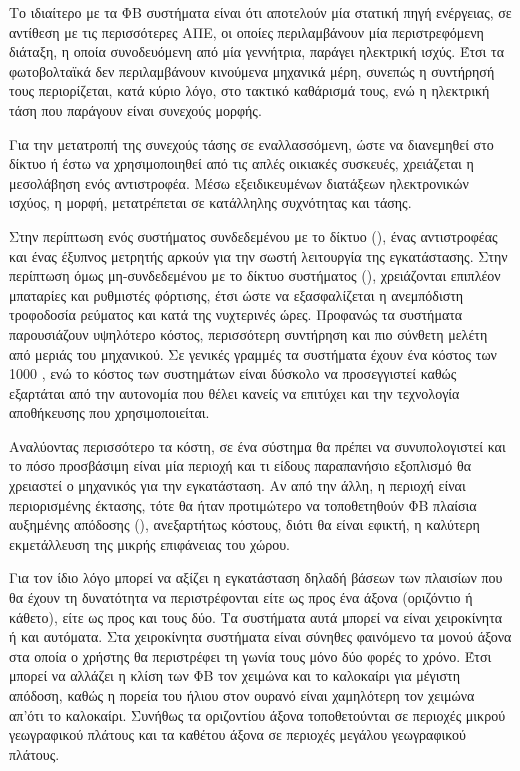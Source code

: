 \documentclass[12pt]{report}
\begin{document}
Το ιδιαίτερο με τα ΦΒ συστήματα είναι ότι αποτελούν μία στατική πηγή ενέργειας, σε αντίθεση με τις περισσότερες ΑΠΕ, οι οποίες περιλαμβάνουν μία περιστρεφόμενη διάταξη, η οποία συνοδευόμενη από μία γεννήτρια, παράγει ηλεκτρική
ισχύς. Έτσι τα φωτοβολταϊκά δεν περιλαμβάνουν κινούμενα μηχανικά μέρη, συνεπώς η συντήρησή τους περιορίζεται, κατά κύριο λόγο, στο τακτικό καθάρισμά τους, ενώ η ηλεκτρική τάση που παράγουν είναι συνεχούς μορφής.

Για την μετατροπή της συνεχούς τάσης σε εναλλασσόμενη, ώστε να διανεμηθεί στο δίκτυο ή έστω να χρησιμοποιηθεί από τις απλές οικιακές συσκευές, χρειάζεται η μεσολάβηση ενός αντιστροφέα. Μέσω εξειδικευμένων διατάξεων ηλεκτρονικών
ισχύος, η {} μορφή, μετατρέπεται σε {} κατάλληλης συχνότητας και τάσης. 

Στην περίπτωση ενός συστήματος συνδεδεμένου με το δίκτυο ({}), ένας αντιστροφέας και ένας έξυπνος μετρητής αρκούν για την σωστή λειτουργία της εγκατάστασης. Στην περίπτωση όμως μη-συνδεδεμένου με το δίκτυο
συστήματος ({}), χρειάζονται επιπλέον μπαταρίες και ρυθμιστές φόρτισης, έτσι ώστε να εξασφαλίζεται η ανεμπόδιστη τροφοδοσία ρεύματος και κατά της νυχτερινές ώρες. Προφανώς τα {}
συστήματα παρουσιάζουν υψηλότερο κόστος, περισσότερη συντήρηση και πιο σύνθετη μελέτη από μεριάς του μηχανικού. Σε γενικές γραμμές τα {} συστήματα έχουν ένα κόστος των 1000 {}, ενώ το κόστος των
{} συστημάτων είναι δύσκολο να προσεγγιστεί καθώς εξαρτάται από την αυτονομία που θέλει κανείς να επιτύχει και την τεχνολογία αποθήκευσης που χρησιμοποιείται.

Αναλύοντας περισσότερο τα κόστη, σε ένα σύστημα θα πρέπει να συνυπολογιστεί και το πόσο προσβάσιμη είναι μία περιοχή και τι είδους παραπανήσιο εξοπλισμό θα χρειαστεί ο μηχανικός για την εγκατάσταση. 
Αν από την άλλη, η περιοχή είναι περιορισμένης έκτασης, τότε θα ήταν προτιμώτερο να τοποθετηθούν ΦΒ πλαίσια αυξημένης απόδοσης ({}), ανεξαρτήτως κόστους, διότι θα είναι εφικτή, η καλύτερη εκμετάλλευση 
της μικρής επιφάνειας του χώρου. 

Για τον ίδιο λόγο μπορεί να αξίζει η εγκατάσταση {} δηλαδή βάσεων των πλαισίων που θα έχουν τη δυνατότητα να περιστρέφονται είτε ως προς ένα άξονα (οριζόντιο ή κάθετο), είτε ως προς και τους δύο.
Τα συστήματα αυτά μπορεί να είναι χειροκίνητα ή και αυτόματα. Στα χειροκίνητα συστήματα είναι σύνηθες φαινόμενο τα {} μονού άξονα στα οποία ο χρήστης θα περιστρέφει τη γωνία τους μόνο δύο φορές το χρόνο.
Έτσι μπορεί να αλλάζει η κλίση των ΦΒ τον χειμώνα και το καλοκαίρι για μέγιστη απόδοση, καθώς η πορεία του ήλιου στον ουρανό είναι χαμηλότερη τον χειμώνα απ'ότι το καλοκαίρι. Συνήθως τα {} οριζοντίου άξονα
τοποθετούνται σε περιοχές μικρού γεωγραφικού πλάτους και τα {} καθέτου άξονα σε περιοχές μεγάλου γεωγραφικού πλάτους.
\end{document}
